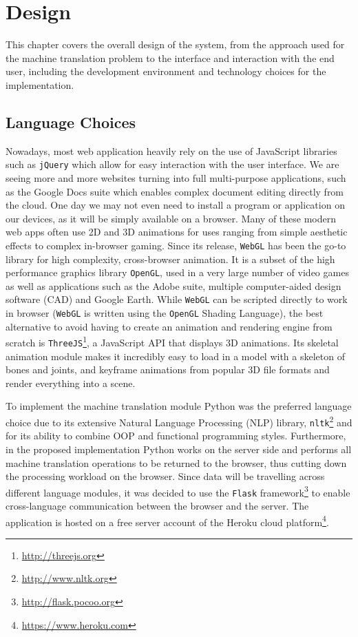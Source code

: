 \documentclass[12pt]{ociamthesis}  %
\newcommand{\tech}{\texttt}
\begin{document}
\chapter{Design}
\label{design}
This chapter covers the overall design of the system, from the approach used for the machine translation problem to the interface and interaction with the end user, including the development environment and technology choices for the implementation.

\section{Language Choices}
Nowadays, most web application heavily rely on the use of JavaScript libraries such as \tech{jQuery} which allow for easy interaction with the user interface. We are seeing more and more websites turning into full multi-purpose applications, such as the Google Docs suite which enables complex document editing directly from the cloud. One day we may not even need to install a program or application on our devices, as it will be simply available on a browser. Many of these modern web apps often use 2D and 3D animations for uses ranging from simple aesthetic effects to complex in-browser gaming. Since its release, \tech{WebGL} has been the go-to library for high complexity, cross-browser animation. It is a subset of the high performance graphics library \tech{OpenGL}, used in a very large number of video games as well as applications such as the Adobe suite, multiple computer-aided design software (CAD) and Google Earth. While \tech{WebGL} can be scripted directly to work in browser (\tech{WebGL} is written using the \tech{OpenGL} Shading Language), the best alternative to avoid having to create an animation and rendering engine from scratch is \tech{ThreeJS}\footnote{\url{http://threejs.org}}, a JavaScript API that displays 3D animations. Its skeletal animation module makes it incredibly easy to load in a model with a skeleton of bones and joints, and keyframe animations from popular 3D file formats and render everything into a scene. 

To implement the machine translation module Python was the preferred language choice due to its extensive Natural Language Processing (NLP) library, \tech{nltk}\footnote{\url{http://www.nltk.org}} and for its ability to combine OOP and functional programming styles. Furthermore, in the proposed implementation Python works on the server side and performs all machine translation operations to be returned to the browser, thus cutting down the processing workload on the browser. Since data will be travelling across different language modules, it was decided to use the \tech{Flask} framework\footnote{\url{http://flask.pocoo.org}} to enable cross-language communication between the browser and the server. The application is hosted on a free server account of the Heroku cloud platform\footnote{\url{https://www.heroku.com}}.
\end{document}
